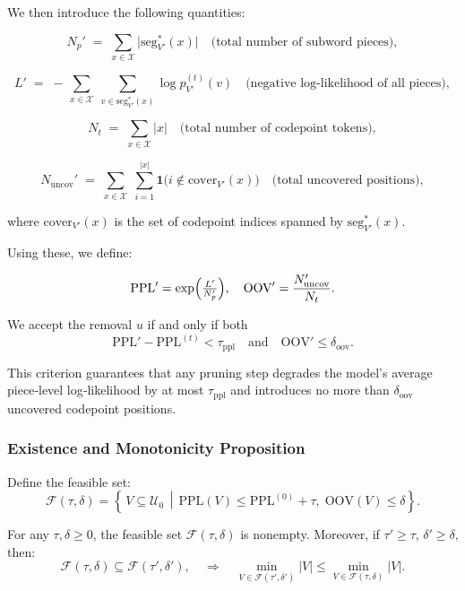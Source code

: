 We then introduce the following quantities:

\[
N_{p}' \;=\;\sum_{x\in\mathcal X} \bigl|\mathrm{seg}^{*}_{V'}(x)\bigr|
\quad\text{(total number of subword pieces)},
\]

\[
L' \;=\; -\,\sum_{x\in\mathcal X}\;\sum_{v\in\mathrm{seg}^{*}_{V'}(x)}\log p^{(t)}_{V'}(v)
\quad\text{(negative log‐likelihood of all pieces)},
\]

\[
N_{t} \;=\;\sum_{x\in\mathcal X} |x|
\quad\text{(total number of codepoint tokens)},
\]

\[
N_{\mathrm{uncov}}' 
\;=\; \sum_{x\in\mathcal X}\;\sum_{i=1}^{|x|}
\mathbf1\bigl(i\not\in \mathrm{cover}_{V'}(x)\bigr)
\quad\text{(total uncovered positions)},
\]

where \(\mathrm{cover}_{V'}(x)\) is the set of codepoint indices spanned by \(\mathrm{seg}^{*}_{V'}(x)\).

Using these, we define:

\[
\mathrm{PPL}' 
= \exp\Bigl(\tfrac{L'}{N_{p}'}\Bigr),
\quad
\mathrm{OOV}' 
= \frac{N_{\mathrm{uncov}}'}{N_{t}}.
\]

We accept the removal \(u\) if and only if both
\[
\mathrm{PPL}' - \mathrm{PPL}^{(t)} < \tau_{\mathrm{ppl}}
\quad\text{and}\quad
\mathrm{OOV}' \le \delta_{\mathrm{oov}}.
\]

This criterion guarantees that any pruning step degrades the model’s average piece‐level log‐likelihood by at most \(\tau_{\mathrm{ppl}}\) and introduces no more than \(\delta_{\mathrm{oov}}\) uncovered codepoint positions.









\subsubsection{Existence and Monotonicity Proposition}

Define the feasible set:
\[
\mathcal F(\tau,\delta)
= \left\{\,V\subseteq\mathcal U_{0}\,\middle|\,
\mathrm{PPL}(V)\le \mathrm{PPL}^{(0)}+\tau,\;
\mathrm{OOV}(V)\le \delta
\right\}.
\]

\begin{proposition}
	For any \(\tau,\delta \ge 0\), the feasible set \(\mathcal F(\tau,\delta)\) is nonempty. Moreover, if \(\tau' \ge \tau\), \(\delta' \ge \delta\), then:
	\[
	\mathcal F(\tau,\delta) \subseteq \mathcal F(\tau',\delta'),
	\quad
	\Rightarrow
	\quad
	\min_{V\in\mathcal F(\tau',\delta')}|V| \le \min_{V\in\mathcal F(\tau,\delta)}|V|.
	\]
\end{proposition}

